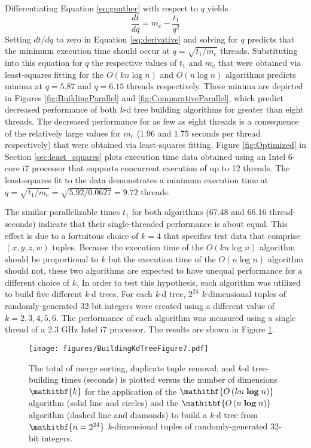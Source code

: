 \documentclass{sig-alternate}
\begin{document}
Differentiating Equation \ref{eq:gunther} with respect to $q$ yields
\begin{equation}\frac{dt}{dq} = m_\mathrm{c} - \frac{t_1}{q^2}
\label{eq:derivative}
\end{equation}
Setting $dt / dq$ to zero in Equation \ref{eq:derivative} and solving for $q$ predicts that the minimum execution time should occur at $q = \sqrt{t_1 / m_\mathrm{c}}$ threads.  Substituting into this equation for $q$ the respective values of $t_1$ and $m_\mathrm{c}$ that were obtained via least-squares fitting for the $O\left(kn \log n\right)$ and $O\left(n \log n\right)$ algorithms predicts minima at $q = 5.87$ and $q = 6.15$ threads respectively.  These minima are depicted in Figures \ref{fig:BuildingParallel} and \ref{fig:ComparativeParallel}, which predict decreased performance of both \emph{k}-d tree building algorithms for greater than eight threads.  The decreased performance for as few as eight threads is a consequence of the relatively large values for $m_\mathrm{c}$ (1.96 and 1.75 seconds per thread respectively) that were obtained via least-squares fitting.  Figure \ref{fig:Optimized} in Section \ref{sec:least_squares} plots execution time data obtained using an Intel 6-core i7 processor that supports concurrent execution of up to 12 threads. The least-squares fit to the data demonstrates a minimum execution time at $q = \sqrt{t_1 / m_\mathrm{c}} = \sqrt{5.92 / 0.0627} = 9.72$ threads.

The similar parallelizable times $t_1$ for both algorithms (67.48 and 66.16 thread-seconds) indicate that their single-threaded performance is about equal.  This effect is due to a fortuitous choice of $k=4$ that specifies test data that comprise $\left(x,y,z,w\right)$ tuples.  Because the execution time of the $O\left(kn \log n\right)$ algorithm should be proportional to $k$ but the execution time of the $O\left(n \log n\right)$ algorithm should not, these two algorithms are expected to have unequal performance for a different choice of $k$.  In order to test this hypothesis, each algorithm was utilized to build five different \emph{k}-d trees.  For each \emph{k}-d tree, $2^{24}$ \emph{k}-dimensional tuples of randomly-generated 32-bit integers were created using a different value of $k=2, 3, 4, 5, 6$.  The performance of each algorithm was measured using a single thread of a 2.3 GHz Intel i7 processor.  The results are shown in Figure \ref{fig:Dimensions}.

\begin{figure}[h]
\centering
\centerline{\texttt{[image: figures/BuildingKdTreeFigure7.pdf]}}
\caption{The total of merge sorting, duplicate tuple removal, and \emph{k}-d tree-building times (seconds) is plotted versus the number of dimensions $\mathitbf{k}$ for the application of the $\mathitbf{O\left(kn \; \boldsymbol{\log} \; n\right)}$ algorithm (solid line and circles) and the $\mathitbf{O\left(n \; \boldsymbol{\log} \; n\right)}$ algorithm (dashed line and diamonds) to build a \emph{k}-d tree from $\mathitbf{n = 2^{24}}$ \emph{k}-dimensional tuples of randomly-generated 32-bit integers.}
\label{fig:Dimensions}
\end{figure}
\end{document}
